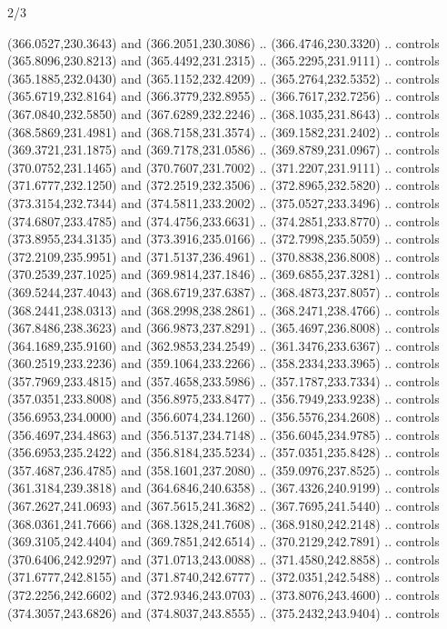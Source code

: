 \begin{flagdescription}{2/3}
\begin{scope}[xshift=0.5\flaglength,yshift=0.5\flagwidth,scale=\flagwidth/495.65]
\begin{scope}[y=0.8pt, x=0.8pt, yscale=-1,shift={(-463.76,-309.78)}]
  (366.0527,230.3643) and (366.2051,230.3086) .. (366.4746,230.3320) .. controls
  (365.8096,230.8213) and (365.4492,231.2315) .. (365.2295,231.9111) .. controls
  (365.1885,232.0430) and (365.1152,232.4209) .. (365.2764,232.5352) .. controls
  (365.6719,232.8164) and (366.3779,232.8955) .. (366.7617,232.7256) .. controls
  (367.0840,232.5850) and (367.6289,232.2246) .. (368.1035,231.8643) .. controls
  (368.5869,231.4981) and (368.7158,231.3574) .. (369.1582,231.2402) .. controls
  (369.3721,231.1875) and (369.7178,231.0586) .. (369.8789,231.0967) .. controls
  (370.0752,231.1465) and (370.7607,231.7002) .. (371.2207,231.9111) .. controls
  (371.6777,232.1250) and (372.2519,232.3506) .. (372.8965,232.5820) .. controls
  (373.3154,232.7344) and (374.5811,233.2002) .. (375.0527,233.3496) .. controls
  (374.6807,233.4785) and (374.4756,233.6631) .. (374.2851,233.8770) .. controls
  (373.8955,234.3135) and (373.3916,235.0166) .. (372.7998,235.5059) .. controls
  (372.2109,235.9951) and (371.5137,236.4961) .. (370.8838,236.8008) .. controls
  (370.2539,237.1025) and (369.9814,237.1846) .. (369.6855,237.3281) .. controls
  (369.5244,237.4043) and (368.6719,237.6387) .. (368.4873,237.8057) .. controls
  (368.2441,238.0313) and (368.2998,238.2861) .. (368.2471,238.4766) .. controls
  (367.8486,238.3623) and (366.9873,237.8291) .. (365.4697,236.8008) .. controls
  (364.1689,235.9160) and (362.9853,234.2549) .. (361.3476,233.6367) .. controls
  (360.2519,233.2236) and (359.1064,233.2266) .. (358.2334,233.3965) .. controls
  (357.7969,233.4815) and (357.4658,233.5986) .. (357.1787,233.7334) .. controls
  (357.0351,233.8008) and (356.8975,233.8477) .. (356.7949,233.9238) .. controls
  (356.6953,234.0000) and (356.6074,234.1260) .. (356.5576,234.2608) .. controls
  (356.4697,234.4863) and (356.5137,234.7148) .. (356.6045,234.9785) .. controls
  (356.6953,235.2422) and (356.8184,235.5234) .. (357.0351,235.8428) .. controls
  (357.4687,236.4785) and (358.1601,237.2080) .. (359.0976,237.8525) .. controls
  (361.3184,239.3818) and (364.6846,240.6358) .. (367.4326,240.9199) .. controls
  (367.2627,241.0693) and (367.5615,241.3682) .. (367.7695,241.5440) .. controls
  (368.0361,241.7666) and (368.1328,241.7608) .. (368.9180,242.2148) .. controls
  (369.3105,242.4404) and (369.7851,242.6514) .. (370.2129,242.7891) .. controls
  (370.6406,242.9297) and (371.0713,243.0088) .. (371.4580,242.8858) .. controls
  (371.6777,242.8155) and (371.8740,242.6777) .. (372.0351,242.5488) .. controls
  (372.2256,242.6602) and (372.9346,243.0703) .. (373.8076,243.4600) .. controls
  (374.3057,243.6826) and (374.8037,243.8555) .. (375.2432,243.9404) .. controls

\end{scope}
\end{scope}
\end{flagdescription}
